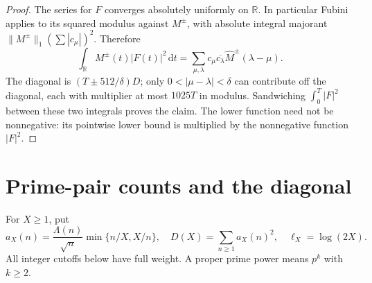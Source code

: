 \documentclass[11pt]{article}
\newcommand{\dd}{\,\mathrm d}
\begin{document}
\begin{proof}
The series for \(F\) converges absolutely uniformly on \(\mathbb R\).
In particular Fubini applies to its squared modulus against \(M^\pm\),
with absolute integral majorant
\(\|M^\pm\|_1(\sum|c_\mu|)^2\). Therefore
\[
 \int_{\mathbb R}M^\pm(t)|F(t)|^2\dd t
 =\sum_{\mu,\lambda}c_\mu\overline{c_\lambda}
       \widehat M^\pm(\lambda-\mu).
\]
The diagonal is \((T\pm512/\delta)D\); only
\(0<|\mu-\lambda|<\delta\) can contribute off the diagonal, each
with multiplier at most \(1025T\) in modulus. Sandwiching
\(\int_0^T|F|^2\) between these two integrals proves the claim.
The lower function need not be nonnegative: its pointwise lower
bound is multiplied by the nonnegative function \(|F|^2\).
\end{proof}

\section{Prime-pair counts and the diagonal}

For \(X\geq1\), put
\begin{equation}\label{eq:prime-coefficients}
 a_X(n)=\frac{\Lambda(n)}{\sqrt n}\min\{n/X,X/n\},\quad
 D(X)=\sum_{n\geq1}a_X(n)^2,\quad \ell_X=\log(2X).
\end{equation}
All integer cutoffs below have full weight. A proper prime power means
\(p^k\) with \(k\geq2\).
\end{document}
